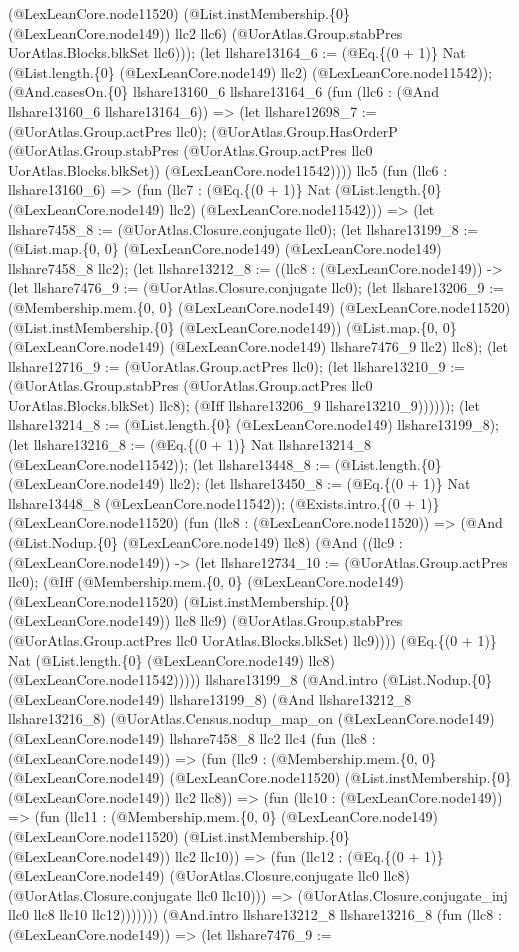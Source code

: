 \documentclass[11pt]{article}
\begin{document}
(@LexLeanCore.node11520) (@List.instMembership.\{0\} (@LexLeanCore.node149)) llc2 llc6) (@UorAtlas.Group.stabPres UorAtlas.Blocks.blkSet llc6))); (let llshare13164\_6 := (@Eq.\{(0 + 1)\} Nat (@List.length.\{0\} (@LexLeanCore.node149) llc2) (@LexLeanCore.node11542)); (@And.casesOn.\{0\} llshare13160\_6 llshare13164\_6 (fun (llc6 : (@And llshare13160\_6 llshare13164\_6)) => (let llshare12698\_7 := (@UorAtlas.Group.actPres llc0); (@UorAtlas.Group.HasOrderP (@UorAtlas.Group.stabPres (@UorAtlas.Group.actPres llc0 UorAtlas.Blocks.blkSet)) (@LexLeanCore.node11542)))) llc5 (fun (llc6 : llshare13160\_6) => (fun (llc7 : (@Eq.\{(0 + 1)\} Nat (@List.length.\{0\} (@LexLeanCore.node149) llc2) (@LexLeanCore.node11542))) => (let llshare7458\_8 := (@UorAtlas.Closure.conjugate llc0); (let llshare13199\_8 := (@List.map.\{0, 0\} (@LexLeanCore.node149) (@LexLeanCore.node149) llshare7458\_8 llc2); (let llshare13212\_8 := ((llc8 : (@LexLeanCore.node149)) -> (let llshare7476\_9 := (@UorAtlas.Closure.conjugate llc0); (let llshare13206\_9 := (@Membership.mem.\{0, 0\} (@LexLeanCore.node149) (@LexLeanCore.node11520) (@List.instMembership.\{0\} (@LexLeanCore.node149)) (@List.map.\{0, 0\} (@LexLeanCore.node149) (@LexLeanCore.node149) llshare7476\_9 llc2) llc8); (let llshare12716\_9 := (@UorAtlas.Group.actPres llc0); (let llshare13210\_9 := (@UorAtlas.Group.stabPres (@UorAtlas.Group.actPres llc0 UorAtlas.Blocks.blkSet) llc8); (@Iff llshare13206\_9 llshare13210\_9)))))); (let llshare13214\_8 := (@List.length.\{0\} (@LexLeanCore.node149) llshare13199\_8); (let llshare13216\_8 := (@Eq.\{(0 + 1)\} Nat llshare13214\_8 (@LexLeanCore.node11542)); (let llshare13448\_8 := (@List.length.\{0\} (@LexLeanCore.node149) llc2); (let llshare13450\_8 := (@Eq.\{(0 + 1)\} Nat llshare13448\_8 (@LexLeanCore.node11542)); (@Exists.intro.\{(0 + 1)\} (@LexLeanCore.node11520) (fun (llc8 : (@LexLeanCore.node11520)) => (@And (@List.Nodup.\{0\} (@LexLeanCore.node149) llc8) (@And ((llc9 : (@LexLeanCore.node149)) -> (let llshare12734\_10 := (@UorAtlas.Group.actPres llc0); (@Iff (@Membership.mem.\{0, 0\} (@LexLeanCore.node149) (@LexLeanCore.node11520) (@List.instMembership.\{0\} (@LexLeanCore.node149)) llc8 llc9) (@UorAtlas.Group.stabPres (@UorAtlas.Group.actPres llc0 UorAtlas.Blocks.blkSet) llc9)))) (@Eq.\{(0 + 1)\} Nat (@List.length.\{0\} (@LexLeanCore.node149) llc8) (@LexLeanCore.node11542))))) llshare13199\_8 (@And.intro (@List.Nodup.\{0\} (@LexLeanCore.node149) llshare13199\_8) (@And llshare13212\_8 llshare13216\_8) (@UorAtlas.Census.nodup\_map\_on (@LexLeanCore.node149) (@LexLeanCore.node149) llshare7458\_8 llc2 llc4 (fun (llc8 : (@LexLeanCore.node149)) => (fun (llc9 : (@Membership.mem.\{0, 0\} (@LexLeanCore.node149) (@LexLeanCore.node11520) (@List.instMembership.\{0\} (@LexLeanCore.node149)) llc2 llc8)) => (fun (llc10 : (@LexLeanCore.node149)) => (fun (llc11 : (@Membership.mem.\{0, 0\} (@LexLeanCore.node149) (@LexLeanCore.node11520) (@List.instMembership.\{0\} (@LexLeanCore.node149)) llc2 llc10)) => (fun (llc12 : (@Eq.\{(0 + 1)\} (@LexLeanCore.node149) (@UorAtlas.Closure.conjugate llc0 llc8) (@UorAtlas.Closure.conjugate llc0 llc10))) => (@UorAtlas.Closure.conjugate\_inj llc0 llc8 llc10 llc12))))))) (@And.intro llshare13212\_8 llshare13216\_8 (fun (llc8 : (@LexLeanCore.node149)) => (let llshare7476\_9 := 
\end{document}
